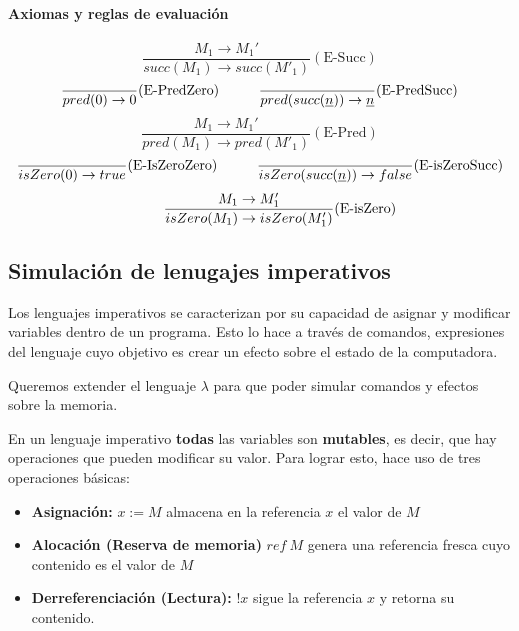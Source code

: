 \paragraph{Axiomas y reglas de evaluación}

\begin{equation*}
		\frac{M_1\to M_1'}{succ(M_1)\to succ(M'_1)}(\text{E-Succ})
	\end{equation*}
	\vspace*{5mm}
	\begin{equation*}
		\frac{}{pred(0)\to 0}(\text{E-PredZero})\hspace*{1cm}\frac{}{pred(succ(\underline{n}))\to \underline{n}}(\text{E-PredSucc})
	\end{equation*}
	\vspace*{5mm}
	\begin{equation*}
		\frac{M_1\to M_1'}{pred(M_1)\to pred(M'_1)}(\text{E-Pred})
	\end{equation*}
	\vspace*{5mm}
	\begin{equation*}
		\frac{}{isZero(0)\to true}(\text{E-IsZeroZero})\hspace*{1cm}\frac{}{isZero(succ(\underline{n}))\to false}(\text{E-isZeroSucc})
	\end{equation*}
	\vspace*{5mm}
	\begin{equation*}
		\hspace*{1cm}\frac{M_1\to M'_1}{isZero(M_1)\to isZero(M_1')}(\text{E-isZero})
	\end{equation*}



\subsection{Simulación de lenugajes imperativos}
Los lenguajes imperativos se caracterizan por su capacidad de asignar y modificar variables dentro de un programa. Esto lo hace a través de comandos, expresiones del lenguaje cuyo objetivo es crear un efecto sobre el estado de la computadora. 

Queremos extender el lenguaje $\lambda$ para que poder simular comandos y efectos sobre la memoria.

En un lenguaje imperativo \textbf{todas} las variables son \textbf{mutables}, es decir, que hay operaciones que pueden modificar su valor. Para lograr esto, hace uso de tres operaciones básicas:

\begin{itemize}
	\item \textbf{Asignación:} $x := M$ almacena en la referencia $x$ el valor de $M$
	\item \textbf{Alocación (Reserva de memoria)} $ref~M$ genera una referencia fresca cuyo contenido es el valor de $M$
	\item \textbf{Derreferenciación (Lectura):} $!x$ sigue la referencia $x$ y retorna su contenido.
\end{itemize}


